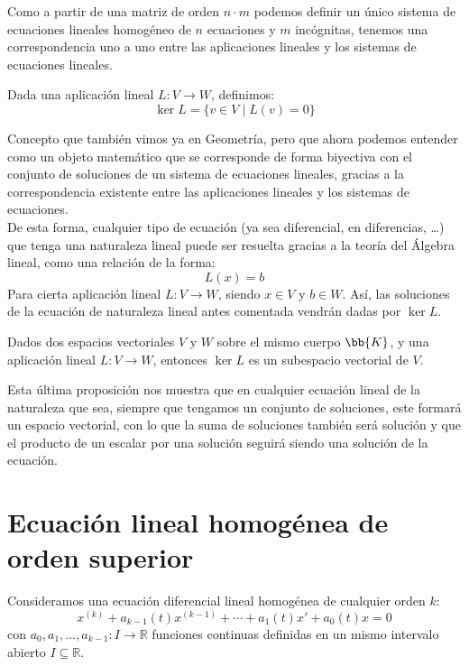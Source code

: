Como a partir de una matriz de orden $n\cdot m$ podemos definir un único sistema de ecuaciones lineales homogéneo de $n$ ecuaciones y $m$ incógnitas, tenemos una correspondencia uno a uno entre las aplicaciones lineales y los sistemas de ecuaciones lineales.

\begin{definicion}[Núcleo]
    Dada una aplicación lineal $L:V\rightarrow W$, definimos:
    \begin{equation*}
        \ker L = \{v\in V \mid L(v) = 0\}
    \end{equation*}
\end{definicion}
Concepto que también vimos ya en Geometría, pero que ahora podemos entender como un objeto matemático que se corresponde de forma biyectiva con el conjunto de soluciones de un sistema de ecuaciones lineales, gracias a la correspondencia existente entre las aplicaciones lineales y los sistemas de ecuaciones.\\

De esta forma, cualquier tipo de ecuación (ya sea diferencial, en diferencias, \ldots) que tenga una naturaleza lineal puede ser resuelta gracias a la teoría del Álgebra lineal, como una relación de la forma:
\begin{equation*}
    L(x) = b
\end{equation*}
Para cierta aplicación lineal $L:V\rightarrow W$, siendo $x\in V$ y $b\in W$. Así, las soluciones de la ecuación de naturaleza lineal antes comentada vendrán dadas por $\ker L$.

\begin{prop}
    Dados dos espacios vectoriales $V$ y $W$ sobre el mismo cuerpo $\bb{K}$, y una aplicación lineal $L:V\rightarrow W$, entonces
    $\ker L$ es un subespacio vectorial de $V$.
\end{prop}
Esta última proposición nos muestra que en cualquier ecuación lineal de la naturaleza que sea, siempre que tengamos un conjunto de soluciones, este formará un espacio vectorial, con lo que la suma de soluciones también será solución y que el producto de un escalar por una solución seguirá siendo una solución de la ecuación.

\section{Ecuación lineal homogénea de orden superior}
\noindent
Consideramos una ecuación diferencial lineal homogénea de cualquier orden $k$:
\begin{equation}\label{eq:linealsup_homogenea}
    x^{(k)} + a_{k-1}(t) x^{(k-1)} + \cdots + a_1(t)x' + a_0(t) x = 0
\end{equation}
con $a_0,a_1,\ldots,a_{k-1}:I\rightarrow\mathbb{R}$ funciones continuas definidas en un mismo intervalo abierto $I\subseteq \mathbb{R}$.\\

